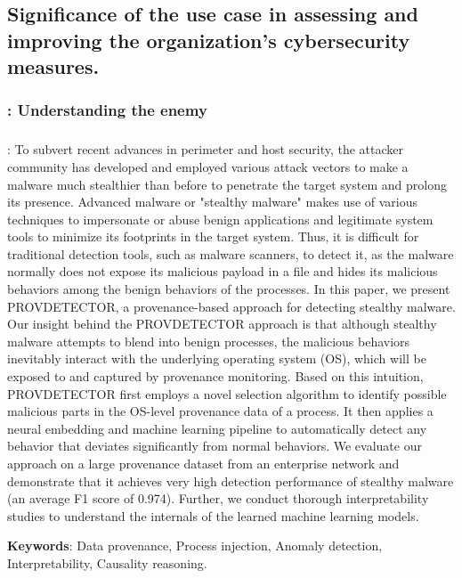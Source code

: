 \documentclass{article}
\begin{document}
\subsection{Significance of the use case in assessing and improving the organization's cybersecurity measures.}


\subsubsection{\textcite{CISA:2023}: Understanding the enemy}
\textbf{}


\subsubsection{\textcite{Wang:2020}}
\textbf{}:  To subvert recent advances in perimeter and host security, the attacker community has developed and employed various attack vectors to make a malware much stealthier than before to penetrate the target system and prolong its presence. Advanced malware or "stealthy malware" makes use of various techniques to impersonate or abuse benign applications and legitimate system tools to minimize its footprints in the target system. Thus, it is difficult for traditional detection tools, such as malware scanners, to detect it, as the malware normally does not expose its malicious payload in a file and hides its malicious behaviors among the benign behaviors of the processes. In this paper, we present PROVDETECTOR, a provenance-based approach for detecting stealthy malware. Our insight behind the PROVDETECTOR approach is that although stealthy malware attempts to blend into benign processes, the malicious behaviors inevitably interact with the underlying operating system (OS), which will be exposed to and captured by provenance monitoring. Based on this intuition, PROVDETECTOR first employs a novel selection algorithm to identify possible malicious parts in the OS-level provenance data of a process. It then applies a neural embedding and machine learning pipeline to automatically detect any behavior that deviates significantly from normal behaviors. We evaluate our approach on a large provenance dataset from an enterprise network and demonstrate that it achieves very high detection performance of stealthy malware (an average F1 score of 0.974). Further, we conduct thorough interpretability studies to understand the internals of the learned machine learning models.

\textbf{Keywords}: Data provenance, Process injection, Anomaly detection, Interpretability, Causality reasoning.
\end{document}
